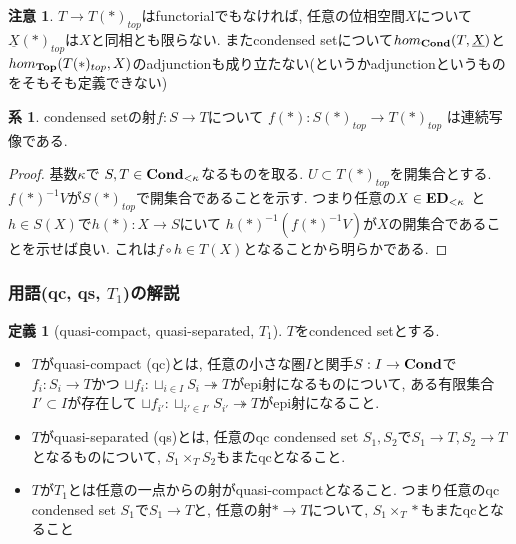 \documentclass[dvipdfmx,a4paper,11pt]{article}
\theoremstyle{definition}
\newtheorem{cor}[thm]{系}
\newtheorem{dfn}[thm]{定義}
\newtheorem{rem}[thm]{注意}
\begin{document}
\begin{rem}
$T \to T(\ast)_{top}$はfunctorialでもなければ, 任意の位相空間$X$について$\underline{X}(\ast)_{top}$は$X$と同相とも限らない. またcondensed setについて$hom_{{\bf Cond}}(T,\underline{X})$と$hom_{{\bf Top}}(T(\ast)_{top}, X)$のadjunctionも成り立たない(というかadjunctionというものをそもそも定義できない)
\end{rem}
  \begin{tcolorbox}
 [colback = white, colframe = green!35!black, fonttitle = \bfseries,breakable = true]
  \begin{cor}
  condensed setの射$f : S\to T$について
  $f(\ast) : S(\ast)_{top} \to T(\ast)_{top}$
  は連続写像である.
 \end{cor}
  \end{tcolorbox}
 \begin{proof}
 基数$\kappa$で
 $S, T \in {\bf Cond}_{< \kappa}$なるものを取る.
 $U \subset T(\ast)_{top}$を開集合とする. 
 $f(\ast)^{-1}V$が$S(\ast)_{top} $で開集合であることを示す.
 つまり任意の$X \in {\bf ED}_{<\kappa}$ と$h \in S(X)$で$h(\ast): X \to S$にいて
 $h(\ast)^{-1}(f(\ast)^{-1}V)$が$X$の開集合であることを示せば良い.
 これは$f \circ h \in T(X)$となることから明らかである. 
 \end{proof}


\subsubsection{用語(qc, qs, $T_1$)の解説}

 \begin{tcolorbox}
 [colback = white, colframe = green!35!black, fonttitle = \bfseries,breakable = true]
\begin{dfn}[quasi-compact, quasi-separated, $T_1$]
$T$をcondenced setとする. 
\begin{itemize}
\item $T$がquasi-compact (qc)とは, 任意の小さな圏$I$と関手$S : I \to {\bf Cond}$で$f_i : S_i \to T$かつ
$\sqcup f_i : \sqcup_{i \in I} S_i \twoheadrightarrow T$がepi射になるものについて, 
ある有限集合$I' \subset I$が存在して
$\sqcup f_{i'} : \sqcup_{i' \in I'} S_{i'} \twoheadrightarrow T$がepi射になること.
\item $T$がquasi-separated (qs)とは, 任意のqc condensed set $S_1, S_2$で$S_1 \to T, S_2\to T$となるものについて, $S_1 \times_{T}S_2$もまたqcとなること.
\item $T$が$T_1$とは任意の一点からの射がquasi-compactとなること. 
つまり任意のqc condensed set $S_1$で$S_1 \to T$と, 任意の射$\ast \to T$について, $S_1 \times_{T}\ast$もまたqcとなること 
\end{itemize}
\end{dfn}
 \end{tcolorbox}
 
\end{document}
